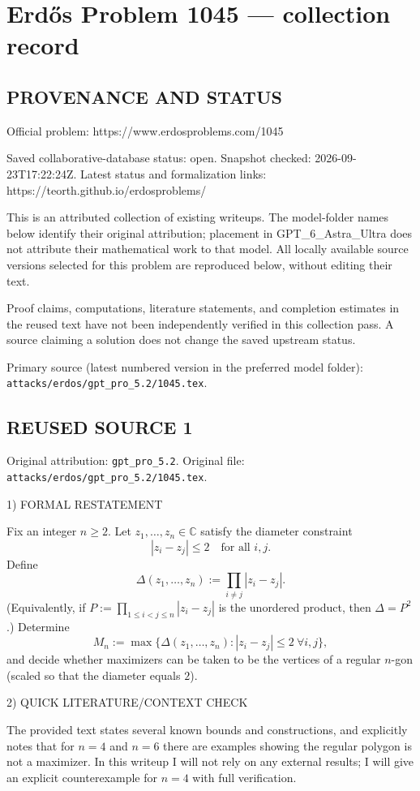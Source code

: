 \section*{Erd\H{o}s Problem 1045 --- collection record}

\subsection*{PROVENANCE AND STATUS}
Official problem: https://www.erdosproblems.com/1045

Saved collaborative-database status: open.
Snapshot checked: 2026-09-23T17:22:24Z.
Latest status and formalization links: https://teorth.github.io/erdosproblems/

This is an attributed collection of existing writeups. The model-folder names below identify their original attribution; placement in GPT\_6\_Astra\_Ultra does not attribute their mathematical work to that model. All locally available source versions selected for this problem are reproduced below, without editing their text.

Proof claims, computations, literature statements, and completion estimates in the reused text have not been independently verified in this collection pass. A source claiming a solution does not change the saved upstream status.

Primary source (latest numbered version in the preferred model folder): \texttt{attacks/erdos/gpt\_pro\_5.2/1045.tex}.

\subsection*{REUSED SOURCE 1}
Original attribution: \texttt{gpt\_pro\_5.2}.
Original file: \texttt{attacks/erdos/gpt\_pro\_5.2/1045.tex}.


1) FORMAL RESTATEMENT

Fix an integer $n\ge 2$. Let $z_1,\dots,z_n\in\mathbb C$ satisfy the diameter constraint
\[
  |z_i-z_j|\le 2\quad\text{for all }i,j.
\]
Define
\[
  \Delta(z_1,\dots,z_n):=\prod_{i\ne j}|z_i-z_j|.
\]
(Equivalently, if $P:=\prod_{1\le i<j\le n}|z_i-z_j|$ is the unordered product, then $\Delta=P^2$.)
Determine
\[
  M_n:=\max\{\Delta(z_1,\dots,z_n): |z_i-z_j|\le 2\ \forall i,j\},
\]
and decide whether maximizers can be taken to be the vertices of a regular $n$-gon (scaled so that the
diameter equals $2$).

2) QUICK LITERATURE/CONTEXT CHECK

The provided text states several known bounds and constructions, and explicitly notes that for $n=4$ and
$n=6$ there are examples showing the regular polygon is not a maximizer.
In this writeup I will not rely on any external results; I will give an explicit counterexample for $n=4$
with full verification.

